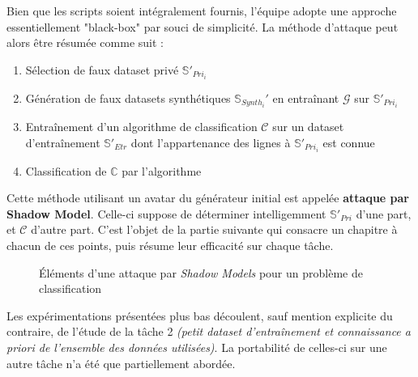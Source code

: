         Bien que les scripts soient intégralement fournis, l'équipe adopte une
        approche essentiellement "black-box" par souci de simplicité. La méthode d'attaque peut
        alors être résumée comme suit :

        \begin{enumerate}
            \item Sélection de faux dataset privé $\mathbb{S}'_{Pri_i}$
            \item Génération de faux datasets synthétiques $\mathbb S_{Synth_i}'$ en entraînant $\mathcal G$ sur $\mathbb{S}'_{Pri_i}$
            \item Entraînement d'un algorithme de classification $\mathcal C$ sur un dataset
            d'entraînement $\mathbb{S}'_{Etr}$ dont l'appartenance des lignes à
            $\mathbb{S}'_{Pri_i}$ est connue
            \item Classification de $\mathbb{C}$ par l'algorithme
        \end{enumerate}

        Cette méthode utilisant un avatar du générateur initial est appelée \textbf{attaque par Shadow Model}. Celle-ci suppose de déterminer intelligemment $\mathbb{S}'_{Pri}$ d'une part, et $\mathcal C$ d'autre part. C'est l'objet de la partie suivante qui consacre un chapitre à chacun de ces points, puis résume leur efficacité sur chaque tâche.

            \newpage\begin{figure}[H]
                \centering
                \fbox{}
                \caption{Éléments d'une attaque par \textit{Shadow Models} pour un problème de classification}
            \end{figure}

        \begin{tcolorbox}[colback=linkborder_Color!5!white,colframe=linkborder_Color!75!black]
            Les expérimentations présentées plus bas découlent, sauf mention explicite du
            contraire, de l'étude de la tâche 2
            \textit{(petit dataset d'entraînement et connaissance a priori de l'ensemble des données utilisées)}.
            La portabilité de celles-ci sur une autre tâche n'a été que partiellement abordée.
        \end{tcolorbox}